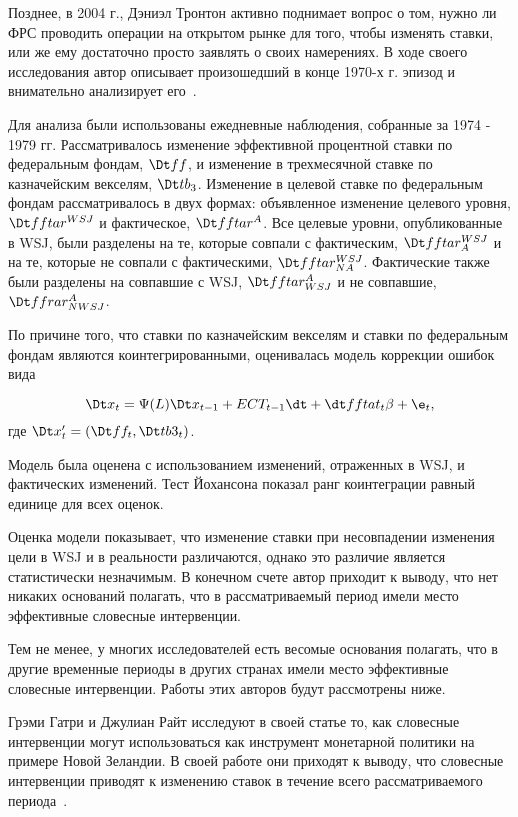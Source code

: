 \documentclass[14pt,a4paper, oneside]{extreport}
\begin{document}
Позднее, в 2004 г., Дэниэл Тронтон активно поднимает вопрос о том, нужно ли ФРС проводить операции на открытом рынке для того, чтобы изменять ставки, или же ему достаточно просто заявлять о своих намерениях. В ходе своего исследования автор описывает произошедший в конце 1970-х г. эпизод и внимательно анализирует его~\cite{thornton2004fed}.

Для анализа были использованы ежедневные наблюдения, собранные за 1974 - 1979 гг. Рассматривалось изменение эффективной процентной ставки по федеральным фондам, $\Dt ff$, и изменение в трехмесячной ставке по казначейским векселям,  $\Dt tb_3$.   Изменение в целевой ставке по федеральным фондам рассматривалось в двух формах: объявленное изменение целевого уровня,  $\Dt fftar^{WSJ} $ и фактическое, $\Dt fftar^{A} $. Все целевые уровни, опубликованные в WSJ, были разделены на те, которые совпали с фактическим,  $\Dt fftar_A^{WSJ}$ и на те, которые не совпали с фактическими, $\Dt fftar_{NA}^{WSJ}$. Фактические также были разделены на совпавшие с WSJ, $\Dt fftar_{WSJ}^A$ и не совпавшие, $\Dt ffrar_{NWSJ}^A$.

По причине того, что ставки по казначейским векселям и ставки по федеральным фондам являются коинтегрированными, оценивалась модель коррекции ошибок вида 

\begin{equation}
\Dt x_t = \Psi(L) \Dt x_{t-1} + ECT_{t-1} \dt + \dt fftat_t \beta + \e_t,
\end{equation} где $\Dt x'_t = (\Dt ff_t, \Dt tb3_t)$.

Модель была оценена с использованием изменений, отраженных в WSJ, и фактических изменений. Тест Йохансона показал ранг коинтеграции равный единице для всех оценок. 

Оценка модели показывает, что изменение ставки при несовпадении изменения цели в WSJ и в реальности различаются, однако это различие является статистически незначимым. В конечном счете автор приходит к выводу, что нет никаких оснований полагать, что в рассматриваемый период имели место эффективные словесные интервенции. 

Тем не менее, у многих исследователей есть весомые основания полагать, что в другие временные периоды в других странах имели место эффективные словесные интервенции. Работы этих авторов будут рассмотрены ниже.

Грэми Гатри и Джулиан Райт исследуют в своей статье то, как словесные интервенции могут использоваться как инструмент монетарной политики на примере Новой Зеландии. В своей работе они приходят к выводу, что словесные интервенции приводят к изменению ставок в течение всего рассматриваемого периода~\cite{guthrie2000open}.
\end{document}
